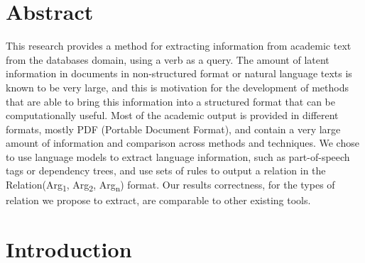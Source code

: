 \documentclass[11pt,a4paper,openright]{memoir}
\title{\theTitle}
\author{\theAuthor}
\begin{document}
\setlength\parindent{24pt}
\captionnamefont{\bfseries}

\frontmatter

\makeunswfrontmatter

\newpage
\thispagestyle{empty}
\strut
\vfill


\chapter*{Abstract}

This research provides a method for extracting information from academic text from the databases domain, using a verb as a query. The amount of latent information in documents in non-structured format or natural language  texts is known to be very large, and this is motivation for the development of methods that are able to bring this information into a structured format that can be computationally useful. Most of the academic output is provided in different formats, mostly PDF (Portable Document Format), and contain a very large amount of information and comparison across methods and techniques. We chose to use language models to extract language information, such as part-of-speech tags or dependency trees, and use sets of rules to output a relation in the Relation(Arg\textsubscript{1}, Arg\textsubscript{2}, Arg\textsubscript{n}) format. Our results correctness, for the types of relation we propose to extract, are comparable to other existing tools.

\clearpage
\tableofcontents

\cleardoublepage

\mainmatter


%
%
%
%


\chapter{Introduction}
\end{document}
